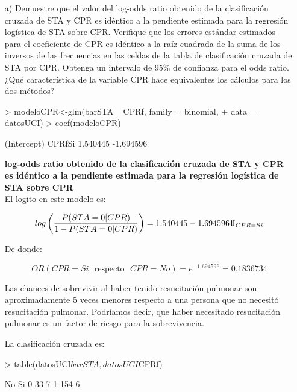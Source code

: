 \documentclass[11pt,onside]{article}
\begin{document}
\begin{itemize}
\item[a)] Demuestre que el valor del log-odds ratio obtenido de la clasificación cruzada de STA y CPR es idéntico a la pendiente estimada para la regresión logística de STA sobre CPR. Verifique que los errores estándar estimados para el coeficiente de CPR es idéntico a la raíz cuadrada de la suma de los inversos de las frecuencias en las celdas de la tabla de clasificación cruzada de STA por CPR. Obtenga un intervalo de 95\% de confianza para el odds ratio. ¿Qué característica de la variable CPR hace equivalentes los cálculos para los dos métodos?

\begin{Schunk}
\begin{Sinput}
> modeloCPR<-glm(barSTA ~ CPRf, family = binomial, 
+                data = datosUCI)
> coef(modeloCPR)
\end{Sinput}
\begin{Soutput}
(Intercept)      CPRfSi 
   1.540445   -1.694596 
\end{Soutput}
\end{Schunk}


\textbf{log-odds ratio obtenido de la clasificación cruzada de STA y CPR es idéntico a la pendiente estimada para la regresión logística de STA sobre CPR}\\


El logito en este modelo es:

$$log \left( \frac{P(STA=0|CPR)}{1-P(STA=0|CPR)} \right)= 1.540445-1.694596\leavevmode\hbox{1\!\rm I}_{CPR=Si}$$

De donde:

$$OR(CPR=Si \ \ \ \text{respecto} \ \ \  CPR=No)=e^{-1.694596}=0.1836734$$

Las chances de sobrevivir al haber tenido resucitación pulmonar son aproximadamente 5 veces menores respecto a una persona que no necesitó resucitación pulmonar. Podríamos decir, que haber necesitado resucitación pulmonar es un factor de riesgo para la sobrevivencia.

La clasificación cruzada es:

\begin{Schunk}
\begin{Sinput}
> table(datosUCI$barSTA, datosUCI$CPRf)
\end{Sinput}
\begin{Soutput}
     No  Si
  0  33   7
  1 154   6
\end{Soutput}
\end{Schunk}


\end{itemize}
\end{document}
